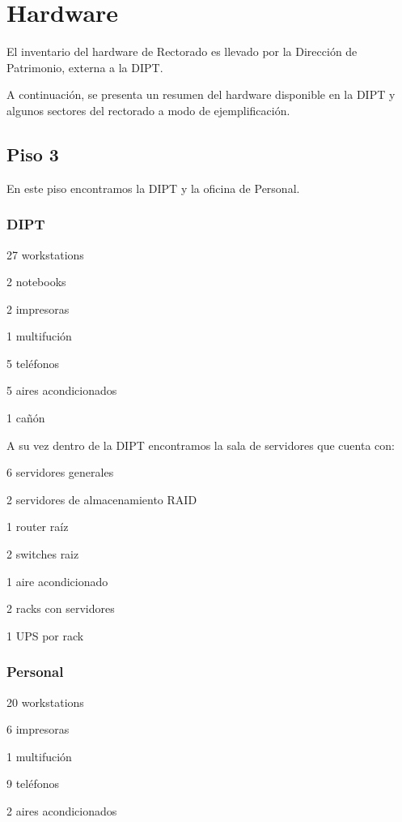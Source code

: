 \documentclass[a4paper,11pt,oneside]{article}
\begin{document}
\section{Hardware}
%
El inventario del hardware de Rectorado es llevado por la
Dirección de Patrimonio, externa a la DIPT.

A continuación, se presenta un resumen del hardware disponible en la
DIPT y algunos sectores del rectorado a modo de ejemplificación.
%
\subsection*{Piso 3}
%
En este piso encontramos la DIPT y la oficina de Personal.
%
\newpage
\subsubsection*{DIPT}
%
\begin{itemize*}
\item 27 workstations
\item 2 notebooks
\item 2 impresoras
\item 1 multifución
\item 5 teléfonos
\item 5 aires acondicionados
\item 1 cañón
\end{itemize*}
%
A su vez dentro de la DIPT encontramos la sala de servidores que cuenta con:
\begin{itemize*}
\item 6 servidores generales
\item 2 servidores de almacenamiento RAID
\item 1 router raíz
\item 2 switches raiz
\item 1 aire acondicionado
\item 2 racks con servidores
\item 1 UPS por rack
\end{itemize*}
%
\subsubsection*{Personal}
\begin{itemize*}
\item 20 workstations
\item 6 impresoras
\item 1 multifución
\item 9 teléfonos
\item 2 aires acondicionados
\end{itemize*}
%
\end{document}
